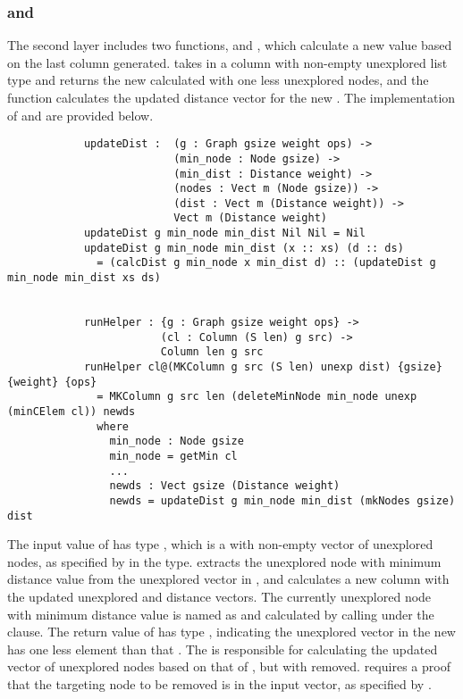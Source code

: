 \subsubsection{ and } \label{second_layer}
The second layer includes two functions,  and , which calculate a new  value based on the last column generated.  takes in a column with non-empty unexplored list type and returns the new  calculated with one less unexplored nodes, and the  function calculates the updated distance vector for the new . The implementation of  and  are provided below. 
\begin{lstlisting}
			updateDist :  (g : Graph gsize weight ops) ->
			              (min_node : Node gsize) ->
			              (min_dist : Distance weight) ->
			              (nodes : Vect m (Node gsize)) ->
			              (dist : Vect m (Distance weight)) ->
			              Vect m (Distance weight)
			updateDist g min_node min_dist Nil Nil = Nil
			updateDist g min_node min_dist (x :: xs) (d :: ds)
			  = (calcDist g min_node x min_dist d) :: (updateDist g min_node min_dist xs ds)


			runHelper : {g : Graph gsize weight ops} ->
			            (cl : Column (S len) g src) ->
			            Column len g src
			runHelper cl@(MKColumn g src (S len) unexp dist) {gsize} {weight} {ops}
			  = MKColumn g src len (deleteMinNode min_node unexp (minCElem cl)) newds
			  where
			  	min_node : Node gsize
    			min_node = getMin cl
			   	...
			    newds : Vect gsize (Distance weight)
			    newds = updateDist g min_node min_dist (mkNodes gsize) dist
\end{lstlisting}

The input value  of  has type , which is a  with non-empty vector of unexplored nodes, as specified by  in the type.  extracts the unexplored node with minimum distance value from the unexplored vector in , and calculates a new column with the updated unexplored and distance vectors. The currently unexplored node with minimum distance value is named as  and calculated by calling  under the  clause. The return value of  has type , indicating the unexplored vector in the new  has one less element than that . The  is responsible for calculating the updated vector of unexplored nodes based on that of , but with  removed.  requires a proof that the targeting node to be removed is in the input vector, as specified by . 
\\

